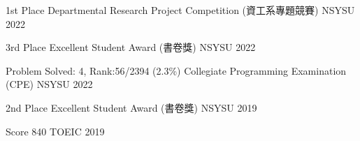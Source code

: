 



\begin{cvhonors}

  \cvhonor
    {1st Place} %
    {Departmental Research Project Competition (資工系專題競賽)} %
    {NSYSU} %
    {2022} %

  \cvhonor
    {3rd Place} %
    {Excellent Student Award (書卷獎)} %
    {NSYSU} %
    {2022} %

  \cvhonor
    {Problem Solved: 4, Rank:56/2394 (2.3\%)} %
    {Collegiate Programming Examination (CPE)} %
    {NSYSU} %
    {2022} %

  \cvhonor
    {2nd Place} %
    {Excellent Student Award (書卷獎)} %
    {NSYSU} %
    {2019} %

  \cvhonor
    {Score 840} %
    {TOEIC} %
    {} %
    {2019} %

\end{cvhonors}
